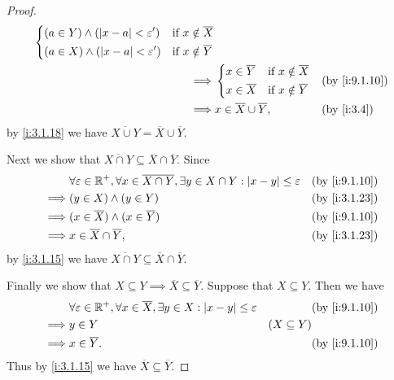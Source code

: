\begin{proof}
\begin{align*}
\begin{dcases}
                 (a \in Y) \land (\abs{x - a} < \varepsilon') & \text{if } x \notin \overline{X} \\
                 (a \in X) \land (\abs{x - a} < \varepsilon') & \text{if } x \notin \overline{Y}
               \end{dcases}                                                           \\
    \implies & \begin{dcases}
                 x \in \overline{Y} & \text{if } x \notin \overline{X} \\
                 x \in \overline{X} & \text{if } x \notin \overline{Y}
               \end{dcases}                                                               &  & \by{i:9.1.10}                                             \\
    \implies & x \in \overline{X} \cup \overline{Y},                                                                                  &  & \by{i:3.4}
  \end{align*}
  by \cref{i:3.1.18} we have \(\overline{X \cup Y} = \overline{X} \cup \overline{Y}\).

  Next we show that \(\overline{X \cap Y} \subseteq \overline{X} \cap \overline{Y}\).
  Since
  \begin{align*}
             & \forall \varepsilon \in \R^+, \forall x \in \overline{X \cap Y}, \exists y \in X \cap Y : \abs{x - y} \leq \varepsilon &  & \by{i:9.1.10} \\
    \implies & (y \in X) \land (y \in Y)                                                                                              &  & \by{i:3.1.23} \\
    \implies & (x \in \overline{X}) \land (x \in \overline{Y})                                                                        &  & \by{i:9.1.10} \\
    \implies & x \in \overline{X} \cap \overline{Y},                                                                                  &  & \by{i:3.1.23}
  \end{align*}
  by \cref{i:3.1.15} we have \(\overline{X \cap Y} \subseteq \overline{X} \cap \overline{Y}\).

  Finally we show that \(X \subseteq Y \implies \overline{X} \subseteq \overline{Y}\).
  Suppose that \(X \subseteq Y\).
  Then we have
  \begin{align*}
             & \forall \varepsilon \in \R^+, \forall x \in \overline{X}, \exists y \in X : \abs{x - y} \leq \varepsilon &                 & \by{i:9.1.10} \\
    \implies & y \in Y                                                                                                  & (X \subseteq Y)                 \\
    \implies & x \in \overline{Y}.                                                                                      &                 & \by{i:9.1.10}
  \end{align*}
  Thus by \cref{i:3.1.15} we have \(\overline{X} \subseteq \overline{Y}\).
\end{proof}

